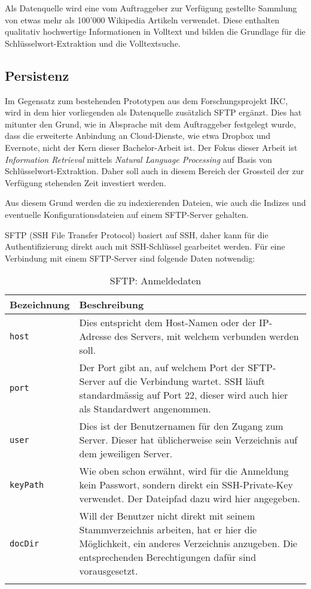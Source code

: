 Als Datenquelle wird eine vom Auftraggeber zur Verfügung gestellte Sammlung von etwas mehr als 100'000 Wikipedia Artikeln verwendet. Diese enthalten qualitativ hochwertige Informationen in Volltext und bilden die Grundlage für die Schlüsselwort-Extraktion und die Volltextsuche.


\subsection{Persistenz}



Im Gegensatz zum bestehenden Prototypen aus dem Forschungsprojekt \gls{IKC}, wird in dem hier vorliegenden als Datenquelle zusätzlich \gls{SFTP} ergänzt. Dies hat mitunter den Grund, wie in Absprache mit dem Auftraggeber festgelegt wurde, dass die erweiterte Anbindung an Cloud-Dienste, wie etwa Dropbox und Evernote, nicht der Kern dieser Bachelor-Arbeit ist. Der Fokus dieser Arbeit ist \textit{Information Retrieval} mittels \textit{Natural Language Processing} auf Basis von Schlüsselwort-Extraktion. Daher soll auch in diesem Bereich der Grossteil der zur Verfügung stehenden Zeit investiert werden. 

Aus diesem Grund werden die zu indexierenden Dateien, wie auch die Indizes und eventuelle Konfigurationsdateien auf einem \gls{SFTP}-Server gehalten.

\gls{SFTP} (SSH File Transfer Protocol) basiert auf \gls{SSH}, daher kann für die Authentifizierung direkt auch mit \gls{SSH}-Schlüssel gearbeitet werden. Für eine Verbindung mit einem \gls{SFTP}-Server sind folgende Daten notwendig:


\begin{longtable}{|p{4cm}| p{8cm}|}
  \hline
    \textbf{Bezeichnung} & \textbf{Beschreibung}\\\hline
    \texttt{host} & Dies entspricht dem Host-Namen oder der IP-Adresse des Servers, mit welchem verbunden werden soll.\\\hline
    \texttt{port} & Der Port gibt an, auf welchem Port der \gls{SFTP}-Server auf die Verbindung wartet. \gls{SSH} läuft standardmässig auf Port 22, dieser wird auch hier als Standardwert angenommen.\\\hline
    \texttt{user} & Dies ist der Benutzernamen für den Zugang zum Server. Dieser hat üblicherweise sein Verzeichnis auf dem jeweiligen Server.\\\hline
    \texttt{keyPath} & Wie oben schon erwähnt, wird für die Anmeldung kein Passwort, sondern direkt ein SSH-Private-Key verwendet. Der Dateipfad dazu wird hier angegeben.\\\hline
    \texttt{docDir} & Will der Benutzer nicht direkt mit seinem Stammverzeichnis arbeiten, hat er hier die Möglichkeit, ein anderes Verzeichnis anzugeben. Die entsprechenden Berechtigungen dafür sind vorausgesetzt.\\\hline
        \caption{SFTP: Anmeldedaten}
    \label{sftp-anmeldung}
\end{longtable}


